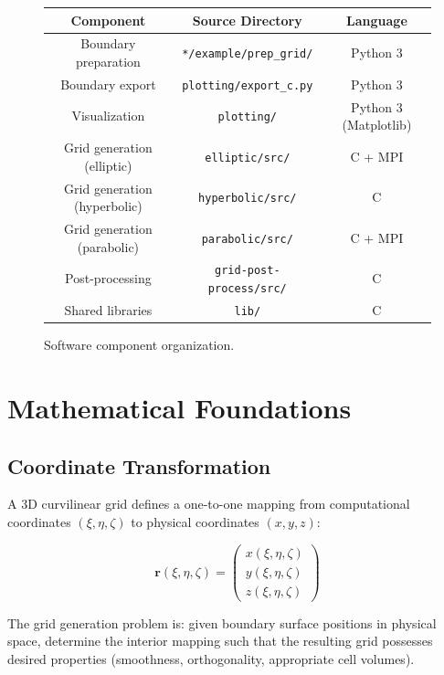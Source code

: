 \documentclass[11pt,a4paper]{report}
\newcommand{\rvec}{\bm{r}}
\begin{document}
\begin{figure}[H]
\centering
\begin{tabular}{ccc}
\toprule
\textbf{Component} & \textbf{Source Directory} & \textbf{Language} \\
\midrule
Boundary preparation & \texttt{*/example/prep\_grid/} & Python 3 \\
Boundary export & \texttt{plotting/export\_c.py} & Python 3 \\
Visualization & \texttt{plotting/} & Python 3 (Matplotlib) \\
Grid generation (elliptic) & \texttt{elliptic/src/} & C + MPI \\
Grid generation (hyperbolic) & \texttt{hyperbolic/src/} & C \\
Grid generation (parabolic) & \texttt{parabolic/src/} & C + MPI \\
Post-processing & \texttt{grid-post-process/src/} & C \\
Shared libraries & \texttt{lib/} & C \\
\bottomrule
\end{tabular}
\caption{Software component organization.}
\end{figure}

\chapter{Mathematical Foundations}

\section{Coordinate Transformation}

A 3D curvilinear grid defines a one-to-one mapping from computational coordinates $(\xi, \eta, \zeta)$ to physical coordinates $(x, y, z)$:

\begin{equation}
    \rvec(\xi, \eta, \zeta) = \begin{pmatrix} x(\xi, \eta, \zeta) \\ y(\xi, \eta, \zeta) \\ z(\xi, \eta, \zeta) \end{pmatrix}
\end{equation}

The grid generation problem is: given boundary surface positions in physical space, determine the interior mapping such that the resulting grid possesses desired properties (smoothness, orthogonality, appropriate cell volumes).
\end{document}
